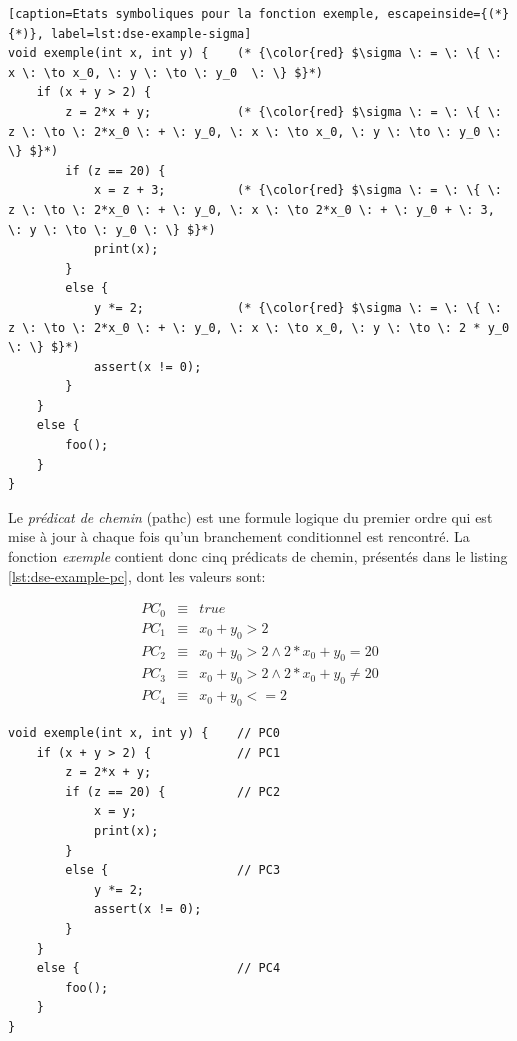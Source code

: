             \begin{center}
            \lstset{basicstyle=\large}
            \lstset{language=C,style=codeC}    
            \begin{lstlisting}[caption=Etats symboliques pour la fonction exemple, escapeinside={(*}{*)}, label=lst:dse-example-sigma]
void exemple(int x, int y) {    (* {\color{red} $\sigma \: = \: \{ \: x \: \to x_0, \: y \: \to \: y_0  \: \} $}*)
    if (x + y > 2) {        
        z = 2*x + y;            (* {\color{red} $\sigma \: = \: \{ \: z \: \to \: 2*x_0 \: + \: y_0, \: x \: \to x_0, \: y \: \to \: y_0 \: \} $}*)
        if (z == 20) {       
            x = z + 3;          (* {\color{red} $\sigma \: = \: \{ \: z \: \to \: 2*x_0 \: + \: y_0, \: x \: \to 2*x_0 \: + \: y_0 + \: 3, \: y \: \to \: y_0 \: \} $}*)
            print(x);           
        }
        else {
            y *= 2;             (* {\color{red} $\sigma \: = \: \{ \: z \: \to \: 2*x_0 \: + \: y_0, \: x \: \to x_0, \: y \: \to \: 2 * y_0 \: \} $}*)
            assert(x != 0);
        }
    }
    else {
        foo();      
    }
}
            \end{lstlisting}
            \end{center}     
         
            Le \textit{prédicat de chemin} (\gls{pathc}) est une formule logique du premier ordre qui est mise à jour à chaque fois qu'un branchement conditionnel est rencontré.
            La fonction \textit{exemple} contient donc cinq prédicats de chemin, présentés dans le listing \ref{lst:dse-example-pc}, dont les valeurs sont:
            
            \begin{eqnarray}
                PC_0 & \equiv & true \\
                PC_1 & \equiv & x_0 + y_0 > 2 \\
                PC_2 & \equiv & x_0 + y_0 > 2 \wedge 2 * x_0 + y_0 = 20 \\
                PC_3 & \equiv & x_0 + y_0 > 2 \wedge 2 * x_0 + y_0 \ne 20 \\
                PC_4 & \equiv & x_0 + y_0 <= 2 
            \end{eqnarray}
            
            \begin{center}
            \lstset{basicstyle=\large}
            \lstset{language=C,style=codeC}    
            \begin{lstlisting}[caption=La fonction exemple, label=lst:dse-example-pc]
void exemple(int x, int y) {    // PC0
    if (x + y > 2) {            // PC1
        z = 2*x + y;              
        if (z == 20) {          // PC2
            x = y;        
            print(x);          
        }
        else {                  // PC3
            y *= 2;
            assert(x != 0);  
        }
    }
    else {                      // PC4   
        foo();            
    }
}
            \end{lstlisting}
            \end{center} 
            
